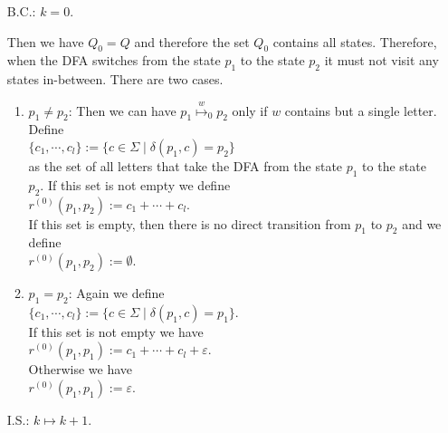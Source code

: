 \begin{enumerate}
\item[B.C.:] $k = 0$.  

  Then we have $Q_0 = Q$ and therefore the set $Q_0$ contains all states.
  Therefore, when the \textsc{DFA} switches from the state $p_1$ to the state $p_2$ it must not visit any
  states in-between.  There are two cases.
  \begin{enumerate}
  \item $p_1 \not= p_2$:  Then we can have  $p_1 \stackrel{w}{\mapsto}_0 p_2$ only if $w$ contains but a
        single letter.  Define
        \\[0.2cm]
        \hspace*{1.3cm}
        $\{ c_1, \cdots, c_l \} := \{ c \in \Sigma \mid \delta(p_1,c) = p_2 \}$
        \\[0.2cm]
        as the set of all letters that take the \textsc{DFA} from the state $p_1$ to the state $p_2$.
        If this set is not empty we define 
        \\[0.2cm]
        \hspace*{1.3cm}
        $r^{(0)}(p_1, p_2) := c_1 + \cdots + c_l$. 
        \\[0.2cm]
        If this set is empty, then there is no direct transition from  $p_1$ to $p_2$ and we define
        \\[0.2cm]
        \hspace*{1.3cm}
        $r^{(0)}(p_1, p_2) := \emptyset$.
  \item $p_1 = p_2$:  Again we define
        \\[0.2cm]
        \hspace*{1.3cm}
        $\{ c_1, \cdots, c_l \} := \{ c \in \Sigma \mid \delta(p_1,c) = p_1 \}$.
        \\[0.2cm]
        If this set is not empty we have
        \\[0.2cm]
        \hspace*{1.3cm}
        $r^{(0)}(p_1, p_1) := c_1 + \cdots + c_l + \varepsilon$.
        \\[0.2cm]
        Otherwise we have
        \\[0.2cm]
        \hspace*{1.3cm}
        $r^{(0)}(p_1, p_1) := \varepsilon$.
   \end{enumerate}
\item[I.S.:] $k \mapsto k+1$.  


\end{enumerate}
